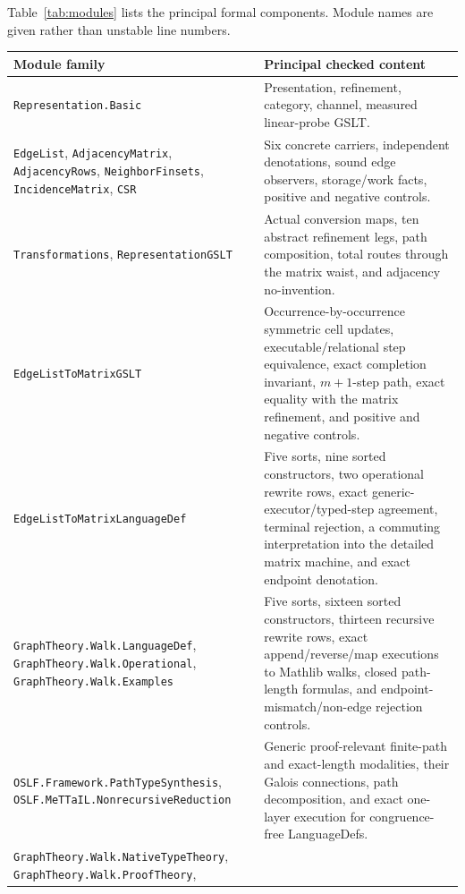 \documentclass[11pt]{article}
\theoremstyle{remark}
\newcommand{\code}[1]{\texttt{#1}}
\begin{document}
Table~\ref{tab:modules} lists the principal formal components.  Module names
are given rather than unstable line numbers.

\begin{table}[htbp]
\centering
\footnotesize
\renewcommand{\arraystretch}{1.13}
\renewcommand{\code}[1]{\nolinkurl{#1}}
\def\UrlBreaks{\do\.}
\begin{tabularx}{\textwidth}{@{}>{\raggedright\arraybackslash}p{}
  >{\raggedright\arraybackslash}X@{}}
\toprule
Module family & Principal checked content \\
\midrule
\code{Representation.Basic} & Presentation, refinement, category, channel,
measured linear-probe GSLT.\\
\code{EdgeList}, \code{AdjacencyMatrix}, \code{AdjacencyRows},
\code{NeighborFinsets}, \code{IncidenceMatrix}, \code{CSR} & Six concrete
carriers, independent denotations, sound edge observers, storage/work facts,
positive and negative controls.\\
\code{Transformations}, \code{RepresentationGSLT} & Actual conversion maps,
ten abstract refinement legs, path composition, total routes through the
matrix waist, and adjacency no-invention.\\
\code{EdgeListToMatrixGSLT} & Occurrence-by-occurrence symmetric cell updates,
executable/relational step equivalence, exact completion invariant,
\(m+1\)-step path, exact equality with the matrix refinement, and positive and
negative controls.\\
\code{EdgeListToMatrixLanguageDef} & Five sorts, nine sorted constructors,
two operational rewrite rows, exact generic-executor/typed-step agreement,
terminal rejection, a commuting interpretation into the detailed matrix
machine, and exact endpoint denotation.\\
\code{GraphTheory.Walk.LanguageDef},
\code{GraphTheory.Walk.Operational},
\code{GraphTheory.Walk.Examples} & Five sorts, sixteen sorted constructors,
thirteen recursive rewrite rows, exact append/reverse/map executions to
Mathlib walks, closed path-length formulas, and endpoint-mismatch/non-edge
rejection controls.\\
\code{OSLF.Framework.PathTypeSynthesis},
\code{OSLF.MeTTaIL.NonrecursiveReduction} & Generic proof-relevant finite-path
and exact-length modalities, their Galois connections, path decomposition,
and exact one-layer execution for congruence-free LanguageDefs.\\
\code{GraphTheory.Walk.NativeTypeTheory},
\code{GraphTheory.Walk.ProofTheory},

\end{tabularx}
\end{table}
\end{document}
